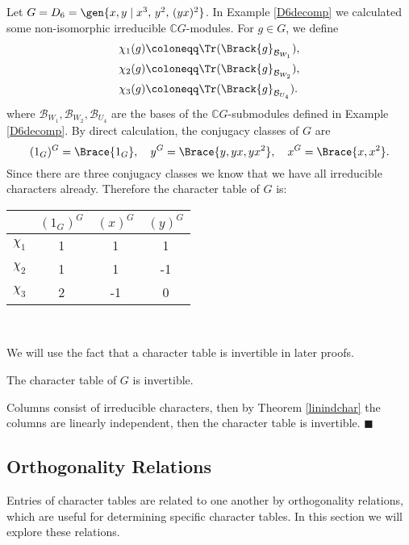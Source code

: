 \documentclass[../Project.tex]{subfiles}
\begin{document}
\begin{exam}
	Let $G = D_6  = \gen{x,y\;\vert\;x^3,\, y^2,\,(yx)^2}$. In Example \ref{D6decomp} we calculated some non-isomorphic irreducible $\mathbb{C}G$-modules. For $g \in G$, we define
	\begin{alignat*}{3}
		&\chi_1(g) \coloneqq \Tr(\Brack{g}_{\mathcal{B}_{W_1}}),\\
		&\chi_2(g) \coloneqq \Tr(\Brack{g}_{\mathcal{B}_{W_2}}),\\
		&\chi_3(g) \coloneqq \Tr(\Brack{g}_{\mathcal{B}_{U_4}}).
	\end{alignat*}
	where $\mathcal{B}_{W_1},\mathcal{B}_{W_2},\mathcal{B}_{U_4}$ are the bases of the $\mathbb{C}G$-submodules defined in Example \ref{D6decomp}.
	By direct calculation, the conjugacy classes of $G$ are
		$$(1_G)^G = \Brace{1_G},\quad y^G = \Brace{y,yx,yx^2},\quad x^G = \Brace{x,x^2}.$$
		Since there are three conjugacy classes we know that we have all irreducible characters already.
	Therefore the character table of $G$ is:\\
	\begin{minipage}{\linewidth}
\centering
	\begin{tabular}{c | c  c  c}
		  $ $ & $(1_G)^G$ & $(x)^G$ & $(y)^G$\\
	\hline
		$\chi_1$ & 1 & 1 & 1 \\
		$\chi_2$ & 1 & 1 & -1 \\
		$\chi_3$ & 2 & -1 & 0 \\
	\hline
	\end{tabular}
	\end{minipage}\\
	\label{chartableD6}
\end{exam}


We will use the fact that a character table is invertible in later proofs.
\begin{prop}[{\cite[Proposition 16.2]{2}}]
\label{chartableinver}
	The character table of $G$ is invertible.
\end{prop}
\begin{proo*}[{\cite[Proposition 16.2]{2}}]
	Columns consist of irreducible characters, then by Theorem \ref{linindchar} the columns are linearly independent, then the character table is invertible. \hfill$\blacksquare$
\end{proo*}

\newpage
\subsection{Orthogonality Relations}
	Entries of character tables are related to one another by orthogonality relations, which are useful for determining specific character tables. In this section we will explore these relations.
\end{document}
